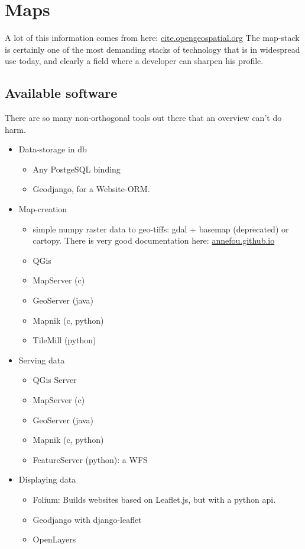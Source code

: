 \section{Maps}

A lot of this information comes from here: \href{http://cite.opengeospatial.org/pub/cite/files/edu/wmts/text/operations.html}{cite.opengeospatial.org}
The map-stack is certainly one of the most demanding stacks of technology that is in widespread use today, and clearly a field where a developer can sharpen his profile.

\subsection{Available software} 

There are so many non-orthogonal tools out there that an overview can't do harm.

\begin{itemize}
    \item Data-storage in db
        \begin{itemize}
            \item Any PostgeSQL binding
            \item Geodjango, for a Website-ORM.
        \end{itemize}
    \item Map-creation
        \begin{itemize}
            \item simple numpy raster data to geo-tiffs: gdal + basemap (deprecated) or cartopy. There is very good documentation here: \href{https://annefou.github.io/metos\_python/04-plotting/}{annefou.github.io}
            \item QGis
            \item MapServer (c)
            \item GeoServer (java)
            \item Mapnik (c, python)
            \item TileMill (python)
        \end{itemize}
    \item Serving data
        \begin{itemize}
	    \item QGis Server
            \item MapServer (c)
            \item GeoServer (java)
            \item Mapnik (c, python)
            \item FeatureServer (python): a WFS 
        \end{itemize}
    \item Displaying data
        \begin{itemize}
            \item Folium: Builds websites based on Leaflet.js, but with a python api.
            \item Geodjango with django-leaflet
            \item OpenLayers
        \end{itemize}
\end{itemize}




